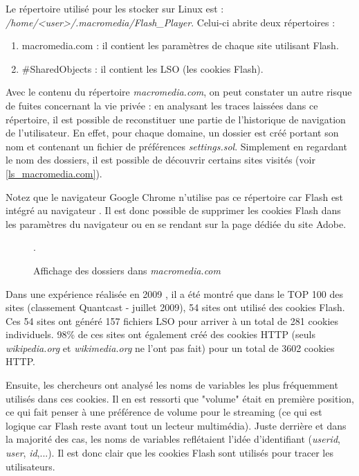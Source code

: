 Le répertoire utilisé pour les stocker sur Linux est :\\
\mbox{\textit{/home/<user>/.macromedia/Flash\_Player}}. Celui-ci abrite deux répertoires :
\begin{enumerate}
  \item macromedia.com : il contient les paramètres de chaque site utilisant Flash.
  \item \#SharedObjects : il contient les LSO (les cookies Flash).
\end{enumerate}

Avec le contenu du répertoire \textit{macromedia.com}, on peut constater un autre risque de fuites concernant la vie privée : en analysant les traces laissées dans ce répertoire, il est possible de reconstituer une partie de l'historique de navigation de l'utilisateur. En effet, pour chaque domaine, un dossier est créé portant son nom et contenant un fichier de préférences \textit{settings.sol}. Simplement en regardant le nom des dossiers, il est possible de découvrir certains sites visités (voir \autoref{ls_macromedia.com}).

Notez que le navigateur Google Chrome n'utilise pas ce répertoire car Flash est intégré au navigateur \cite{flash_chrome}. Il est donc possible de supprimer les cookies Flash dans les paramètres du navigateur ou en se rendant sur la page dédiée du site Adobe.
\newline

\begin{figure}[h]
	\centering
	
	\caption{\label{ls_macromedia.com}Affichage des dossiers dans \textit{macromedia.com}}.
\end{figure}

Dans une expérience réalisée en 2009 \cite{conf/aaaiss/SoltaniCMTH10}, il a été montré que dans le TOP 100 des sites (classement Quantcast - juillet 2009), 54 sites ont utilisé des cookies Flash. Ces 54 sites ont généré 157 fichiers LSO pour arriver à un total de 281 cookies individuels. 98\% de ces sites ont également créé des cookies HTTP (seuls \textit{wikipedia.org} et \textit{wikimedia.org} ne l'ont pas fait) pour un total de 3602 cookies HTTP.

Ensuite, les chercheurs ont analysé les noms de variables les plus fréquemment utilisés dans ces cookies. Il en est ressorti que "volume" était en première position, ce qui fait penser à une préférence de volume pour le streaming (ce qui est logique car Flash reste avant tout un lecteur multimédia). Juste derrière et dans la majorité des cas, les noms de variables reflétaient l'idée d'identifiant (\textit{userid}, \textit{user}, \textit{id},...). Il est donc clair que les cookies Flash sont utilisés pour tracer les utilisateurs.

